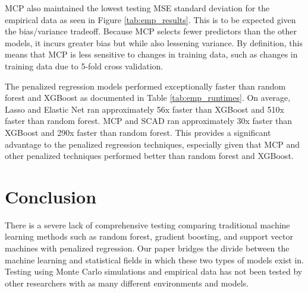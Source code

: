 \documentclass{article}
\begin{document}

	
	MCP also maintained the lowest testing MSE standard deviation for the empirical data as seen in Figure \ref{tab:emp_results}. This is to be expected given the bias/variance tradeoff. Because MCP selects fewer predictors than the other models, it incurs greater bias but while also lessening variance. By definition, this means that MCP is less sensitive to changes in training data, such as changes in training data due to 5-fold cross validation. 
	
	The penalized regression models performed exceptionally faster than random forest and XGBoost as documented in Table \ref{tab:emp_runtimes}. On average, Lasso and Elastic Net ran approximately 56x faster than XGBoost and 510x faster than random forest. MCP and SCAD ran approximately 30x faster than XGBoost and 290x faster than random forest. This provides a significant advantage to the penalized regression techniques, especially given that MCP and other penalized techniques performed better than random forest and XGBoost. 
	
	
	\section{Conclusion}\label{sec:conclusion}
	
	There is a severe lack of comprehensive testing comparing traditional machine learning methods such as random forest, gradient boosting, and support vector machines with penalized regression. Our paper bridges the divide between the machine learning and statistical fields in which these two types of models exist in. Testing using Monte Carlo simulations and empirical data has not been tested by other researchers with as many different environments and models.
	
\end{document}
